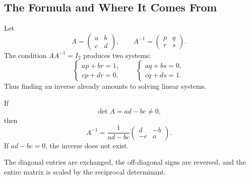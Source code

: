 \subsection{The Formula and Where It Comes From}

Let
\[
A=\begin{pmatrix}a&b\\c&d\end{pmatrix},
\qquad
A^{-1}=\begin{pmatrix}p&q\\r&s\end{pmatrix}.
\]
The condition $AA^{-1}=I_2$ produces two systems:
\[
\begin{cases}ap+br=1,\\cp+dr=0,
\end{cases}
\qquad
\begin{cases}aq+bs=0,\\cq+ds=1.
\end{cases}
\]
Thus finding an inverse already amounts to solving linear systems.

\begin{theorembox}
If
\[
\det A=ad-bc\neq0,
\]
then
\[
\boxed{A^{-1}=\frac1{ad-bc}
\begin{pmatrix}d&-b\\-c&a\end{pmatrix}}.
\]
If $ad-bc=0$, the inverse does not exist.
\end{theorembox}

The diagonal entries are exchanged, the off-diagonal signs are reversed, and the entire matrix is scaled by the reciprocal determinant.
